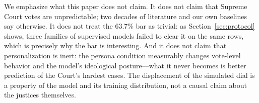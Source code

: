 We emphasize what this paper does not claim. It does not claim that
Supreme Court votes are unpredictable; two decades of literature and
our own baselines say otherwise. It does not treat the 63.7\% bar as
trivial: as Section~\ref{sec:protocol} shows, three families of
supervised models failed to clear it on the same rows, which is
precisely why the bar is interesting. And it does not claim that
personalization is inert: the persona condition measurably changes
vote-level behavior and the model's ideological posture---what it
never becomes is better prediction of the Court's hardest cases. The
displacement of the simulated dial is a property of the model and its
training distribution, not a causal claim about the justices
themselves.
